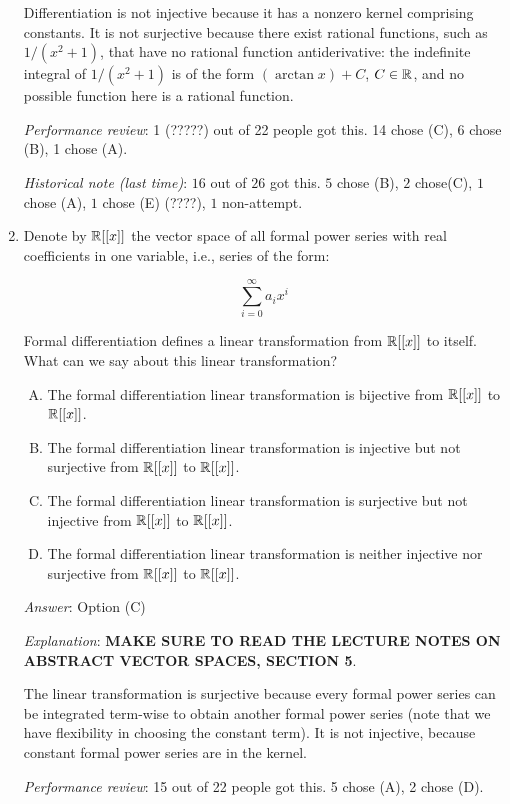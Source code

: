 \documentclass[10pt]{amsart}
\begin{document}
\begin{enumerate}
  Differentiation is not injective because it has a
  nonzero kernel comprising constants. It is not surjective because
  there exist rational functions, such as $1/(x^2 + 1)$, that have no
  rational function antiderivative: the indefinite integral of $1/(x^2
  + 1)$ is of the form $(\arctan x) + C$, $C \in \mathbb{R}$, and no possible
  function here is a rational function.

  {\em Performance review}: 1 (?????) out of 22 people got this. 14
  chose (C), 6 chose (B), 1 chose (A).

  {\em Historical note (last time)}: $16$ out of $26$ got this. $5$ chose (B),
  $2$ chose(C), $1$ chose (A), $1$ chose (E) (????), $1$ non-attempt.

\item Denote by $\mathbb{R}[[x]]$ the vector space of all formal power series
  with real coefficients in one variable, i.e., series of the form:

  $$\sum_{i=0}^\infty a_ix^i$$

  Formal differentiation defines a linear transformation from
  $\mathbb{R}[[x]]$ to itself. What can we say about this linear transformation?

  \begin{enumerate}[(A)]
  \item The formal differentiation linear transformation is bijective
    from $\mathbb{R}[[x]]$ to $\mathbb{R}[[x]]$.
  \item The formal differentiation linear transformation is injective
    but not surjective from $\mathbb{R}[[x]]$ to $\mathbb{R}[[x]]$.
  \item The formal differentiation linear transformation is surjective but
    not injective from $\mathbb{R}[[x]]$ to $\mathbb{R}[[x]]$.
  \item The formal differentiation linear transformation is neither
    injective nor surjective from $\mathbb{R}[[x]]$ to $\mathbb{R}[[x]]$.
  \end{enumerate}

  {\em Answer}: Option (C)

  {\em Explanation}: {\bf MAKE SURE TO READ THE LECTURE NOTES ON
    ABSTRACT VECTOR SPACES, SECTION 5}.

  The linear transformation is surjective because every formal power
  series can be integrated term-wise to obtain another formal power
  series (note that we have flexibility in choosing the constant
  term). It is not injective, because constant formal power series are
  in the kernel.

  {\em Performance review}: 15 out of 22 people got this. 5 chose (A),
  2 chose (D).


\end{enumerate}
\end{document}
